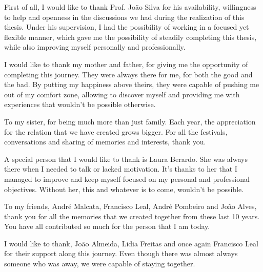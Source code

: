 \begin{acknowledgments}  
 
 
First of all, I would like to thank Prof. João Silva for his availability, willingness to help and openness in the discussions we had during the realization of this thesis. Under his supervision, I had the possibility of working in a focused yet flexible manner, which gave me the possibility of steadily completing this thesis, while also improving myself personally and professionally.  
 
 
I would like to thank my mother and father, for giving me the opportunity of completing this journey. They were always there for me, for both the good and the bad. By putting my happiness above theirs, they were capable of pushing me out of my comfort zone, allowing to discover myself and providing me with experiences that wouldn't be possible otherwise. 
 
 
To my sister, for being much more than just family. Each year, the appreciation for the relation that we have created grows bigger. For all the festivals, conversations and sharing of memories and interests, thank you. 
 
 
A special person that I would like to thank is Laura Berardo. She was always there when I needed to talk or lacked motivation. It's thanks to her that I managed to improve and keep myself focused on my personal and professional objectives. Without her, this and whatever is to come, wouldn't be possible. 
 
 
To my friends, André Malcata, Francisco Leal, André Pombeiro and João Alves, thank you for all the memories that we created together from these last 10 years. You have all contributed so much for the person that I am today.  
 
 
I would like to thank, João Almeida, Lidia Freitas and once again Francisco Leal for their support along this journey. Even though there was almost always someone who was away, we were capable of staying together.  
 
 
\end{acknowledgments} 
\clearpage 
\thispagestyle{empty} 
\cleardoublepage 
 
